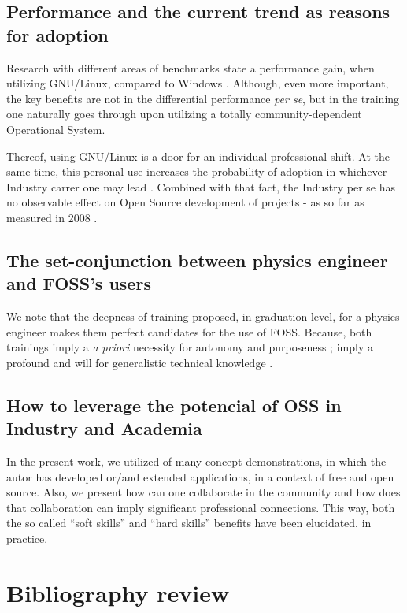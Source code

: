 \documentclass[
12pt,				%
openright,			%
oneside,			%
a4paper,			%
brazil,				%
english,			%
]{abntex2}
\begin{document}
\section{Performance and the current trend as reasons for adoption}

Research with different areas of benchmarks state a performance gain, when utilizing GNU/Linux, compared to Windows \cite{sulaiman2021comparison}. Although, even more important, the key benefits are not in the differential performance \textit{per se}, but in the training one naturally goes through upon utilizing a totally community-dependent Operational System. 

Thereof, using GNU/Linux is a door for an individual professional shift. At the same time, this personal use increases the probability of adoption in whichever Industry carrer one may lead \cite{hauge2008adoption}. Combined with that fact, the Industry per se has no observable effect on Open Source development of projects - as so far as measured in 2008 \cite{hauge2008adoption}.

\section{The set-conjunction between physics engineer and FOSS's users}

We note that the deepness of training proposed, in graduation level, for a physics engineer makes them perfect candidates for the use of FOSS. Because, both trainings imply a \textit{a priori} necessity for autonomy and purposeness \cite{schrape2019open,racero2020predicting}; imply a profound and will for generalistic technical knowledge \cite{li2013all,gallego2015open}.

\section{How to leverage the potencial of OSS in Industry and Academia}

In the present work, we utilized of many concept demonstrations, in
which the autor has developed or/and extended applications, in a
context of free and open source. Also, we present how can one
collaborate in the community and how does that collaboration can imply
significant professional connections. This way, both the so called
``soft skills'' and ``hard skills'' benefits have been elucidated, in practice.  

\chapter{Bibliography review}
\end{document}
